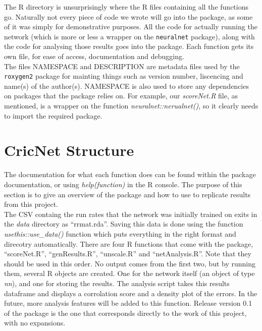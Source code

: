 The R directory is unsurprisingly where the R files containing all the functions go. Naturally not every piece of code we wrote will go into the package, as some of it was simply for demonstrative purposes. All the code for actually running the network (which is more or less a wrapper on the \verb|neuralnet| package), along with the code for analysing those results goes into the package.
Each function gets its own file, for ease of access, documentation and debugging. \\

The files NAMESPACE and DESCRIPTION are metadata files used by the \verb|roxygen2| package for mainting things such as version number, liscencing and name(s) of the author(s). NAMESPACE is also used to store any dependencies on packages that the package relies on. For example, our \textit{scoreNet.R} file, as mentioned, is a wrapper on the function \textit{neuralnet::nerualnet()}, so it clearly needs to import the required package.


\section{CricNet Structure}

The documentation for what each function does can be found within the package documentation, or using \textit{help(function)} in the R console. The purpose of this section is to give an overview of the package and how to use to replicate results from this project. \\

The CSV containg the run rates that the network was initially trained on exits in the \textit{data} directory as ``rrmat.rda''. Saving this data is done using the function \textit{usethis::use\_data()} function which puts everything in the right format and direcotry automatically. There are four R functions that come with the package, ``scoreNet.R'', ``genResults.R'', ``unscale.R'' and ``netAnalysis.R''. Note that they should be used in this order. No output comes from the first two, but by running them, several R objects are created. One for the network itself (an object of type \textit{nn}), and one for storing the results. The analysis script takes this results dataframe and displays a corrolation score and a density plot of the errors. In the future, more analysis features will be added to this function. Release version 0.1 of the package is the one that corresponds directly to the work of this project, with no expansions.\\

